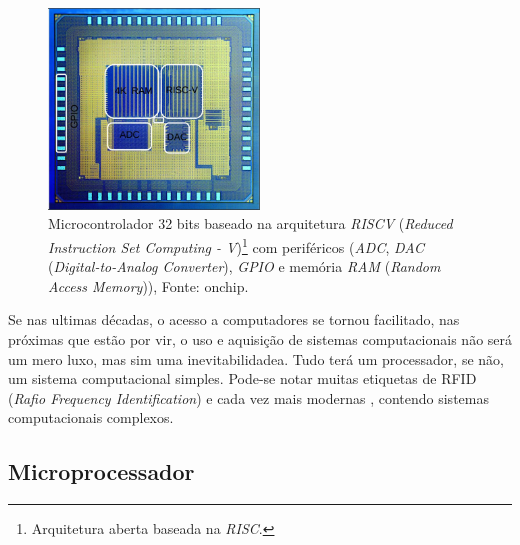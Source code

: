 

\begin{figure}[!htb]
  \centering
  \caption[Microcontrolador na pastilha de silício.]{Microcontrolador 32 bits baseado na arquitetura \textit{RISCV} (\textit{Reduced Instruction Set Computing - V})\footnote{Arquitetura aberta baseada na \textit{RISC}.}
  com periféricos (\textit{ADC}, \textit{DAC} (\textit{Digital-to-Analog Converter}), \textit{GPIO} e memória \textit{RAM} (\textit{Random Access Memory})), Fonte: onchip\cite{onchip}.}
  \label{fig:ricv}
  \includegraphics[width=0.5\textwidth]{figuras/riscv.jpg}
\end{figure}


Se nas ultimas décadas, o acesso a computadores se tornou facilitado, nas próximas que estão por vir, o uso e aquisição de sistemas computacionais não será um mero luxo, mas sim uma inevitabilidadea\cite{gates1995estrada}. Tudo terá um processador, se não, um sistema computacional simples. Pode-se notar muitas etiquetas de RFID (\textit{Rafio Frequency Identification}) e cada vez mais modernas \cite{ricci2008design}, contendo sistemas computacionais complexos.


\subsection{Microprocessador}

